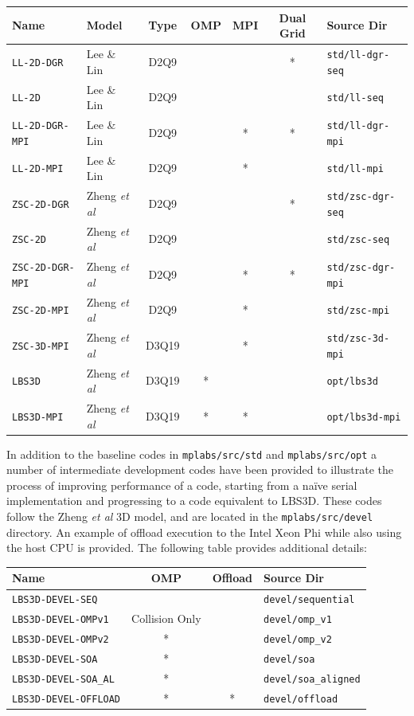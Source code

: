 \documentclass[12pt]{report}
\begin{document}
\begin{tabular}{|l|l|c|c|c|c|l|}
\hline
Name & Model & Type & OMP & MPI & Dual Grid & Source Dir\\
\hline
\texttt{LL-2D-DGR}& Lee \& Lin & D2Q9 & &   & * & \texttt{std/ll-dgr-seq}\\
\hline
\texttt{LL-2D}& Lee \& Lin & D2Q9 &   & &   & \texttt{std/ll-seq}\\
\hline
\texttt{LL-2D-DGR-MPI}& Lee \& Lin & D2Q9 & & * & * & \texttt{std/ll-dgr-mpi}\\
\hline
\texttt{LL-2D-MPI}& Lee \& Lin & D2Q9 & & * &   & \texttt{std/ll-mpi}\\
\hline
\texttt{ZSC-2D-DGR}& Zheng \it{et al} & D2Q9 & &   & * & \texttt{std/zsc-dgr-seq}\\
\hline
\texttt{ZSC-2D}& Zheng \it{et al} & D2Q9 & &   &   & \texttt{std/zsc-seq}\\
\hline
\texttt{ZSC-2D-DGR-MPI}& Zheng \it{et al} & D2Q9 &  & * & * & \texttt{std/zsc-dgr-mpi}\\
\hline
\texttt{ZSC-2D-MPI}& Zheng \it{et al} & D2Q9 & & * &   & \texttt{std/zsc-mpi}\\
\hline
\texttt{ZSC-3D-MPI}& Zheng \it{et al} & D3Q19 & & * &   & \texttt{std/zsc-3d-mpi}\\
\hline
\texttt{LBS3D}& Zheng \it{et al} & D3Q19 & * &  &   & \texttt{opt/lbs3d}\\
\hline
\texttt{LBS3D-MPI}& Zheng \it{et al} & D3Q19 & * & * &   & \texttt{opt/lbs3d-mpi}\\
\hline
\end{tabular}

In addition to the baseline codes in \texttt{mplabs/src/std} and \texttt{mplabs/src/opt} a number of intermediate development codes have been provided to illustrate the process of improving performance of a code, starting from a na\"ive serial implementation and progressing to a code equivalent to LBS3D. These codes follow the Zheng \textit{et al} 3D model, and are located in the \texttt{mplabs/src/devel} directory. An example of offload execution to the Intel Xeon Phi while also using the host CPU is provided. The following table provides additional details:

 \begin{tabular}{|l|c|c|l|}
\hline
Name & OMP & Offload & Source Dir\\
\hline
\texttt{LBS3D-DEVEL-SEQ}&  &  & \texttt{devel/sequential}\\
\hline
\texttt{LBS3D-DEVEL-OMPv1}& Collision Only &  & \texttt{devel/omp\_v1}\\
\hline
\texttt{LBS3D-DEVEL-OMPv2}& * &  & \texttt{devel/omp\_v2}\\
\hline
\texttt{LBS3D-DEVEL-SOA}& * &  & \texttt{devel/soa}\\
\hline
\texttt{LBS3D-DEVEL-SOA\_AL}& * &  & \texttt{devel/soa\_aligned}\\
\hline
\texttt{LBS3D-DEVEL-OFFLOAD}& * & * & \texttt{devel/offload}\\
\hline
\end{tabular}
\end{document}
